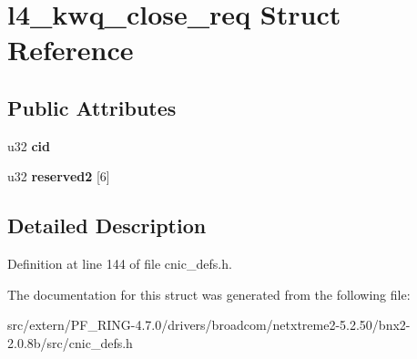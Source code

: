 \hypertarget{structl4__kwq__close__req}{
\section{l4\_\-kwq\_\-close\_\-req Struct Reference}
\label{structl4__kwq__close__req}
}
\subsection*{Public Attributes}
\begin{DoxyCompactItemize}
\item 
\hypertarget{structl4__kwq__close__req_ab69413baec23815d691a953358b1d15d}{
u32 {\bfseries cid}}
\label{structl4__kwq__close__req_ab69413baec23815d691a953358b1d15d}

\item 
\hypertarget{structl4__kwq__close__req_ab120bacea29ad5445088d76a0e3c38f3}{
u32 {\bfseries reserved2} \mbox{[}6\mbox{]}}
\label{structl4__kwq__close__req_ab120bacea29ad5445088d76a0e3c38f3}

\end{DoxyCompactItemize}


\subsection{Detailed Description}


Definition at line 144 of file cnic\_\-defs.h.



The documentation for this struct was generated from the following file:\begin{DoxyCompactItemize}
\item 
src/extern/PF\_\-RING-\/4.7.0/drivers/broadcom/netxtreme2-\/5.2.50/bnx2-\/2.0.8b/src/cnic\_\-defs.h\end{DoxyCompactItemize}
